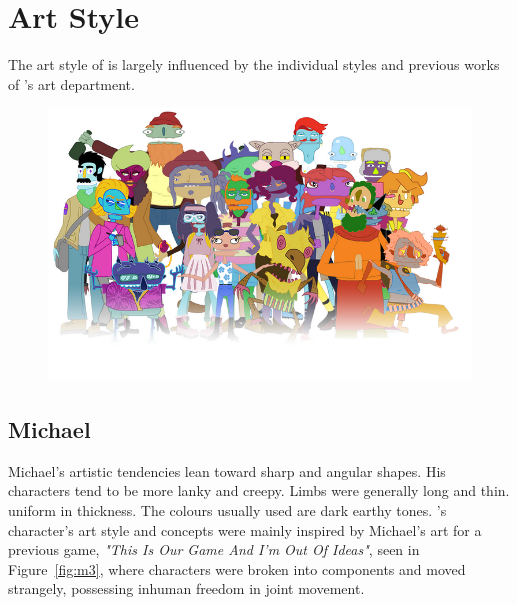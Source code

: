 \section{Art Style}
The art style of \ourgame{} is largely influenced by the individual styles and previous works of \ourteam{}'s art department.

\begin{figure}[H]
\centering\includegraphics[width=0.7\linewidth]{images/art_style}
\end{figure}

\clearpage
\subsection{Michael}
Michael's artistic tendencies lean toward sharp and angular shapes. His characters tend to be more lanky and creepy. Limbs were generally long and thin. uniform in thickness. The colours usually used are dark earthy tones. \ourgame{}'s character's art style and concepts were mainly inspired by Michael's art for a previous game, \textit{"This Is Our Game And I'm Out Of Ideas"}, seen in Figure~\ref{fig:m3}, where characters were broken into components and moved strangely, possessing inhuman freedom in joint movement. 

